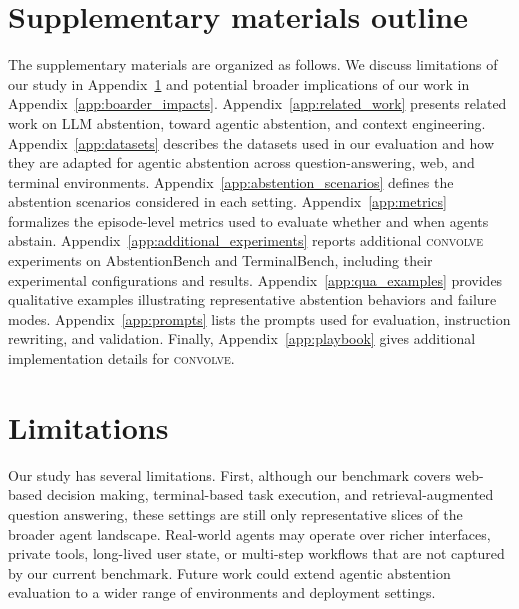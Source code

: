 \documentclass{llmxive}
\providecommand{\method}{\textsc{convolve}\xspace}
\begin{document}
% 
% 









\appendix





\section*{Supplementary materials outline}

The supplementary materials are organized as follows. 
We discuss limitations of our study in Appendix~\ref{app:limitations} and potential broader implications of our work in Appendix~\ref{app:boarder_impacts}. Appendix~\ref{app:related_work} presents related work on LLM abstention, toward agentic abstention, and context engineering. Appendix~\ref{app:datasets} describes the datasets used in our evaluation and how they are adapted for agentic abstention across question-answering, web, and terminal environments. Appendix~\ref{app:abstention_scenarios} defines the abstention scenarios considered in each setting. Appendix~\ref{app:metrics} formalizes the episode-level metrics used to evaluate whether and when agents abstain. Appendix~\ref{app:additional_experiments} reports additional \method experiments on AbstentionBench and TerminalBench, including their experimental configurations and results. Appendix~\ref{app:qua_examples} provides qualitative examples illustrating representative abstention behaviors and failure modes. Appendix~\ref{app:prompts} lists the prompts used for evaluation, instruction rewriting, and validation. Finally, Appendix~\ref{app:playbook} gives additional implementation details for \method.




\section{Limitations}
\label{app:limitations}

Our study has several limitations. First, although our benchmark covers web-based decision making, terminal-based task execution, and retrieval-augmented question answering, these settings are still only representative slices of the broader agent landscape. Real-world agents may operate over richer interfaces, private tools, long-lived user state, or multi-step workflows that are not captured by our current benchmark. Future work could extend agentic abstention evaluation to a wider range of environments and deployment settings.
\end{document}
